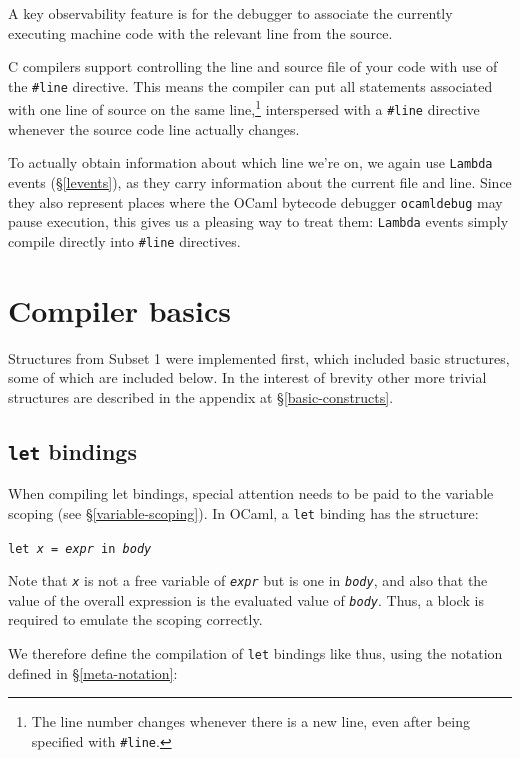 A key observability feature is for the debugger to associate the currently
executing machine code with the relevant line from the source.

C compilers support controlling the line and source file of your code with use
of the \texttt{\#}\texttt{line} directive. This means the compiler can put all
statements associated with one line of source on the same line,\footnote{The
    line number changes whenever there is a new line, even after being specified
    with \texttt{\#}\texttt{line}.} interspersed with a \verb|#line| directive
whenever the source code line actually changes.

To actually obtain information about which line we're on, we again use
\texttt{Lambda} events (\S\ref{levents}), as they carry information about the
current file and line. Since they also represent places where the OCaml bytecode
debugger \texttt{ocamldebug} may pause execution, this gives us a pleasing way
to treat them: \texttt{Lambda} events simply compile directly into \verb|#line|
directives.

\section{Compiler basics}\label{compiler-basics}

Structures from Subset 1 were implemented first, which included basic
structures, some of which are included below. In the interest of brevity other
more trivial structures are described in the appendix at
\S\ref{basic-constructs}.

\subsection{\texttt{let} bindings}

When compiling let bindings, special attention needs to be paid to the variable
scoping (see \S\ref{variable-scoping}). In OCaml, a \texttt{let} binding has the
structure:

\begin{center}
    \texttt{let \emph{x} = \emph{expr} in \emph{body}}
\end{center}

Note that \texttt{\emph{x}} is not a free variable of \texttt{\emph{expr}} 
but is one in \texttt{\emph{body}}, and also that the value of the overall 
expression is the evaluated value of \texttt{\emph{body}}. Thus, a block is 
required to emulate the scoping correctly.

We therefore define the compilation of \texttt{let} bindings like thus, using
the notation defined in \S\ref{meta-notation}:

